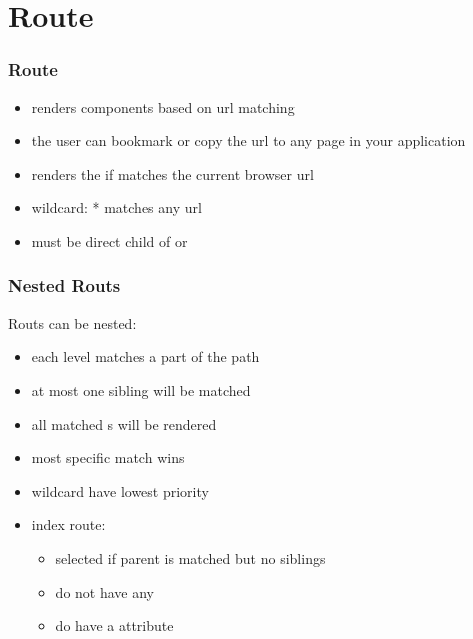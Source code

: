 \section{Route}
\begin{frame}[fragile] \frametitle{Route}
\begin{itemize}
  \item renders components based on url matching
  \item the user can bookmark or copy the url to any page in your application
  \item renders the  if  matches the current browser url
  \item wildcard: * matches any url
  \item {} must be direct child of  or 
\end{itemize}
\end{frame}

\begin{frame}[fragile] \frametitle{Nested Routs}
Routs can be nested:
\begin{itemize}
  \item each level matches a part of the path
  \item at most one sibling  will be matched
  \item all matched s will be rendered
  \item most specific match wins
  \item wildcard have lowest priority
  \item index route:\\ 
  \begin{itemize}
    \item selected if parent is matched but no siblings
    \item do not have any 
    \item do have a  attribute
  \end{itemize}
\end{itemize}
\end{frame}


